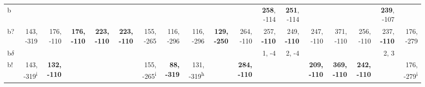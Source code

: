 \begin{table}[p]
{\begin{tabular}{lrrrrrrrrrrrrrrrrr}
b &  &  &  &  &  &  &  &  &  &  & \textbf{258}, -114 & \textbf{251}, -114 &  &  &  & \textbf{239}, -107 &  \\
b? & 143, -319 & 176, -110 & \textbf{176, -110} & \textbf{223, -110} & \textbf{223, -110} & 155, -265 & 116, -296 & 116, -296 & \textbf{129, -250} & 264, -110 & 257, \textbf{-110} & 249, \textbf{-110} & 247, -110 & 371, -110 & 256, -110 & 237, \textbf{-110} & 176, -279 \\
b$\delta$ &  &  &  &  &  &  &  &  &  &  & 1, -4 & 2, -4 &  &  &  & 2, 3 &  \\
b! & 143, -319\textsuperscript{i} & \textbf{132, -110} &  &  &  & 155, -265\textsuperscript{i} & \textbf{88, -319} & 131, -319\textsuperscript{h} &  & \textbf{284, -110} &  &  & \textbf{209, -110} & \textbf{369, -110} & \textbf{242, -110} &  & 176, -279\textsuperscript{i} \\

\end{tabular}
}
\end{table}
\clearpage


